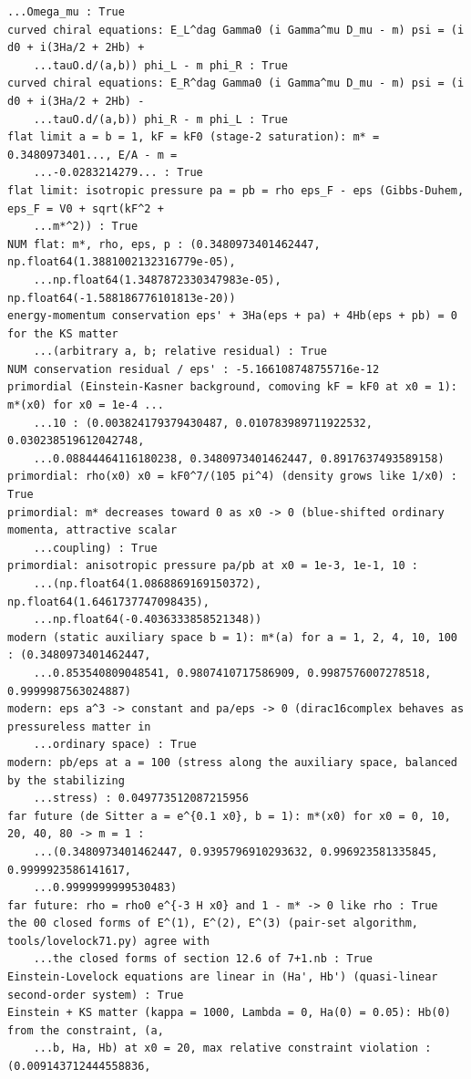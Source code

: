 \documentclass[10pt,a4paper]{article}
\begin{document}
\begin{Verbatim}[fontsize=\small,frame=single,framesep=2mm]
    ...Omega_mu : True
curved chiral equations: E_L^dag Gamma0 (i Gamma^mu D_mu - m) psi = (i d0 + i(3Ha/2 + 2Hb) +
    ...tauO.d/(a,b)) phi_L - m phi_R : True
curved chiral equations: E_R^dag Gamma0 (i Gamma^mu D_mu - m) psi = (i d0 + i(3Ha/2 + 2Hb) -
    ...tauO.d/(a,b)) phi_R - m phi_L : True
flat limit a = b = 1, kF = kF0 (stage-2 saturation): m* = 0.3480973401..., E/A - m =
    ...-0.0283214279... : True
flat limit: isotropic pressure pa = pb = rho eps_F - eps (Gibbs-Duhem, eps_F = V0 + sqrt(kF^2 +
    ...m*^2)) : True
NUM flat: m*, rho, eps, p : (0.3480973401462447, np.float64(1.3881002132316779e-05),
    ...np.float64(1.3487872330347983e-05), np.float64(-1.588186776101813e-20))
energy-momentum conservation eps' + 3Ha(eps + pa) + 4Hb(eps + pb) = 0 for the KS matter
    ...(arbitrary a, b; relative residual) : True
NUM conservation residual / eps' : -5.166108748755716e-12
primordial (Einstein-Kasner background, comoving kF = kF0 at x0 = 1): m*(x0) for x0 = 1e-4 ...
    ...10 : (0.003824179379430487, 0.010783989711922532, 0.030238519612042748,
    ...0.08844464116180238, 0.3480973401462447, 0.8917637493589158)
primordial: rho(x0) x0 = kF0^7/(105 pi^4) (density grows like 1/x0) : True
primordial: m* decreases toward 0 as x0 -> 0 (blue-shifted ordinary momenta, attractive scalar
    ...coupling) : True
primordial: anisotropic pressure pa/pb at x0 = 1e-3, 1e-1, 10 :
    ...(np.float64(1.0868869169150372), np.float64(1.6461737747098435),
    ...np.float64(-0.4036333858521348))
modern (static auxiliary space b = 1): m*(a) for a = 1, 2, 4, 10, 100 : (0.3480973401462447,
    ...0.853540809048541, 0.9807410717586909, 0.9987576007278518, 0.9999987563024887)
modern: eps a^3 -> constant and pa/eps -> 0 (dirac16complex behaves as pressureless matter in
    ...ordinary space) : True
modern: pb/eps at a = 100 (stress along the auxiliary space, balanced by the stabilizing
    ...stress) : 0.049773512087215956
far future (de Sitter a = e^{0.1 x0}, b = 1): m*(x0) for x0 = 0, 10, 20, 40, 80 -> m = 1 :
    ...(0.3480973401462447, 0.9395796910293632, 0.996923581335845, 0.9999923586141617,
    ...0.9999999999530483)
far future: rho = rho0 e^{-3 H x0} and 1 - m* -> 0 like rho : True
the 00 closed forms of E^(1), E^(2), E^(3) (pair-set algorithm, tools/lovelock71.py) agree with
    ...the closed forms of section 12.6 of 7+1.nb : True
Einstein-Lovelock equations are linear in (Ha', Hb') (quasi-linear second-order system) : True
Einstein + KS matter (kappa = 1000, Lambda = 0, Ha(0) = 0.05): Hb(0) from the constraint, (a,
    ...b, Ha, Hb) at x0 = 20, max relative constraint violation : (0.009143712444558836,

\end{Verbatim}
\end{document}
